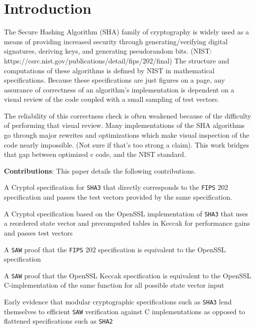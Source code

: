 \section{Introduction}\label{sec:introduction}
  The Secure Hashing Algorithm (SHA) family of cryptography is widely used as a means of providing increased security through generating/verifying digital signatures, deriving keys, and generating pseudorandom bits. (NIST: https://csrc.nist.gov/publications/detail/fips/202/final)  
  The structure and computations of these algorithms is defined by NIST in mathematical specifications.  
  Because these specifications are just figures on a page, any assurance of correctness of an algorithm’s implementation is dependent on a visual review of the code coupled with a small sampling of test vectors.
  
  The reliability of this correctness check is often weakened because of the difficulty of performing that visual review.  
  Many implementations of the SHA algorithms go through major rewrites and optimizations which make visual inspection of the code nearly impossible. (Not sure if that’s too strong a claim).
  This work bridges that gap between optimized c code, and the NIST standard.
  
\noindent \textbf{Contributions}:
This paper details the following contributions.
\begin{compactitem}
  \item  A Cryptol specification for \texttt{SHA3} that directly corresponds to the \texttt{FIPS} 202 specification and passes the test vectors provided by the same specification.
  \item A Cryptol specification based on the OpenSSL implementation of \texttt{SHA3} that uses a reordered state vector and precomputed tables in Keccak for performance gains and passes test vectors
  \item A \texttt{SAW} proof that the \texttt{FIPS} 202 specification is equivalent to the OpenSSL specification
  \item A \texttt{SAW} proof that the OpenSSL Keccak specification is equivalent to the OpenSSL C-implementation of the same function for all possible state vector input
  \item Early evidence that modular cryptographic specifications such as \texttt{SHA3} lend themselves to efficient \texttt{SAW} verification against C implementations as opposed to flattened specifications such as \texttt{SHA2} 
\end{compactitem}

